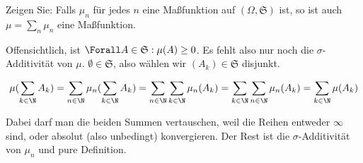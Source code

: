 
\begin{exercise}

Zeigen Sie: Falls $\mu_n$ für jedes $n$ eine Maßfunktion auf $(\Omega, \mathfrak{S})$ ist, so ist auch $\mu = \sum_n \mu_n$ eine Maßfunktion.

\end{exercise}


\begin{solution}

Offensichtlich, ist $\Forall A \in \mathfrak{S}: \mu(A) \geq 0$. Es fehlt also nur noch die $\sigma$-Additivität von $\mu$. $\emptyset \in \mathfrak{S}$, also wählen wir $(A_k) \in \mathfrak{S}$ disjunkt.

\begin{align*}
  \mu(\sum_{k \in \N} A_k)
  =
  \sum_{n \in \N} \mu_n(\sum_{k \in \N} A_k)
  =
  \sum_{n \in \N} \sum_{k \in \N} \mu_n(A_k)
  =
  \sum_{k \in \N} \sum_{n \in \N} \mu_n(A_k)
  =
  \sum_{k \in \N} \mu(A_k)
\end{align*}

Dabei darf man die beiden Summen vertauschen, weil die Reihen entweder $\infty$ sind, oder absolut (also unbedingt) konvergieren. Der Rest ist die $\sigma$-Additivität von $\mu_n$ und pure Definition.

\end{solution}

